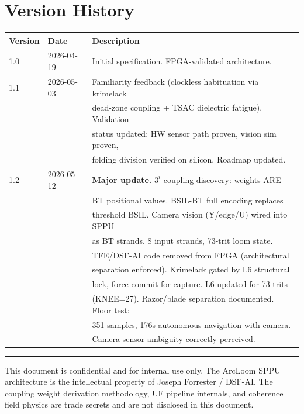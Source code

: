 \documentclass[11pt, a4paper]{article}
\begin{document}
\section{Version History}

\begin{center}
\begin{tabular}{@{}lll@{}}
\toprule
\textbf{Version} & \textbf{Date} & \textbf{Description} \\
\midrule
1.0 & 2026-04-19 & Initial specification. FPGA-validated architecture. \\
1.1 & 2026-05-03 & Familiarity feedback (clockless habituation via krimelack \\
    &            & dead-zone coupling + TSAC dielectric fatigue). Validation \\
    &            & status updated: HW sensor path proven, vision sim proven, \\
    &            & folding division verified on silicon. Roadmap updated. \\
1.2 & 2026-05-12 & \textbf{Major update.} $3^i$ coupling discovery: weights ARE \\
    &            & BT positional values. BSIL-BT full encoding replaces \\
    &            & threshold BSIL. Camera vision (Y/edge/U) wired into SPPU \\
    &            & as BT strands. 8 input strands, 73-trit loom state. \\
    &            & TFE/DSF-AI code removed from FPGA (architectural \\
    &            & separation enforced). Krimelack gated by L6 structural \\
    &            & lock, force commit for capture. L6 updated for 73 trits \\
    &            & (KNEE=27). Razor/blade separation documented. Floor test: \\
    &            & 351 samples, 176s autonomous navigation with camera. \\
    &            & Camera-sensor ambiguity correctly perceived. \\
\bottomrule
\end{tabular}
\end{center}

\vspace{2em}
\hrule
\vspace{0.5em}
{\color{tfe-gray}\small This document is confidential and for internal use only.
The ArcLoom SPPU architecture is the intellectual property of
Joseph Forrester / DSF-AI. The coupling weight derivation methodology,
UF pipeline internals, and coherence field physics are trade secrets
and are not disclosed in this document.}
\end{document}
